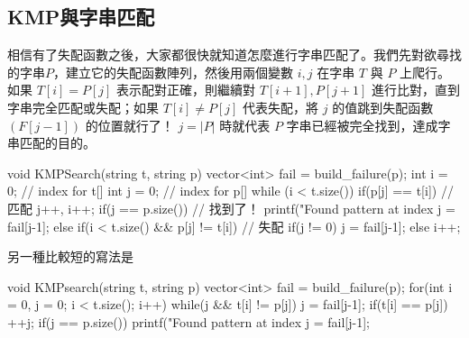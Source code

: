 \documentclass[main.tex]{subfiles}
\begin{document}
\subsection{KMP與字串匹配}

相信有了失配函數之後，大家都很快就知道怎麼進行字串匹配了。我們先對欲尋找的字串$P$，建立它的失配函數陣列，然後用兩個變數 $i, j$ 在字串 $T$ 與 $P$ 上爬行。\\

如果 $T[i] = P[j]$ 表示配對正確，則繼續對 $T[i+1], P[j+1]$ 進行比對，直到字串完全匹配或失配；如果 $T[i] \neq P[j]$ 代表失配，將 $j$ 的值跳到失配函數 $(F[j-1])$ 的位置就行了！ $j = |P|$ 時就代表 $P$ 字串已經被完全找到，達成字串匹配的目的。

\begin{C++}
void KMPSearch(string t, string p){
    vector<int> fail = build_failure(p);
    int i = 0; // index for t[]
    int j = 0; // index for p[]
    while (i < t.size()){
        if(p[j] == t[i]){ // 匹配
            j++, i++;
        }
        if(j == p.size()){ // 找到了！
            printf("Found pattern at index %
            j = fail[j-1];
        }
        else if(i < t.size() && p[j] != t[i]){ // 失配
            if(j != 0) j = fail[j-1];
            else i++;
        }
    }
}
\end{C++}
另一種比較短的寫法是
\begin{C++}
void KMPsearch(string t, string p) {
	vector<int> fail = build_failure(p);
	for(int i = 0, j = 0; i < t.size(); i++) {
		while(j && t[i] != p[j]) j = fail[j-1];
		if(t[i] == p[j]) ++j;
		if(j == p.size()) {
			printf("Found pattern at index %
			j = fail[j-1];
		}
	}
}
\end{C++}
\end{document}

